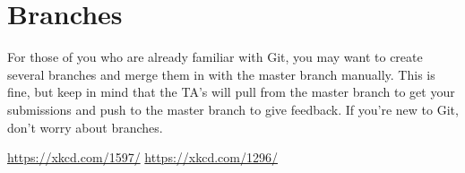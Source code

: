 \section*{Branches} %

For those of you who are already familiar with Git, you may want to create several branches and merge them in with the master branch manually. This is fine, but keep in mind that the TA's will pull from the master branch to get your submissions and push to the master branch to give feedback. If you're new to Git, don't worry about branches.

\url{https://xkcd.com/1597/}
\url{https://xkcd.com/1296/}

